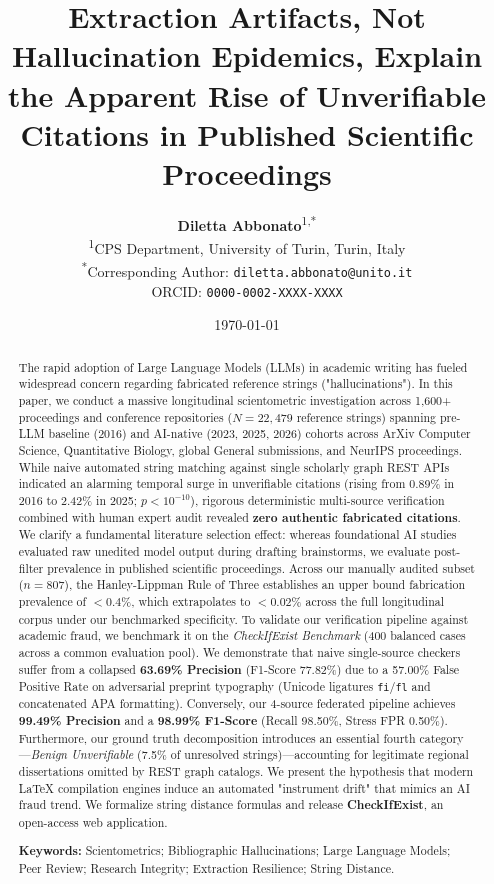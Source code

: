 \documentclass[11pt, a4paper]{article}
\title{\textbf{Extraction Artifacts, Not Hallucination Epidemics, Explain the Apparent Rise of Unverifiable Citations in Published Scientific Proceedings}}
\author{
    \textbf{Diletta Abbonato}\textsuperscript{1,*} \\
    \small \textsuperscript{1}CPS Department, University of Turin, Turin, Italy \\
    \small \textsuperscript{*}Corresponding Author: \texttt{diletta.abbonato@unito.it} \\
    \small ORCID: \texttt{0000-0002-XXXX-XXXX} %
}
\date{\today}
\begin{document}
\maketitle

\begin{abstract}
The rapid adoption of Large Language Models (LLMs) in academic writing has fueled widespread concern regarding fabricated reference strings ("hallucinations"). In this paper, we conduct a massive longitudinal scientometric investigation across 1,600+ proceedings and conference repositories (\(N=22,479\) reference strings) spanning pre-LLM baseline (2016) and AI-native (2023, 2025, 2026) cohorts across ArXiv Computer Science, Quantitative Biology, global General submissions, and NeurIPS proceedings. While naive automated string matching against single scholarly graph REST APIs indicated an alarming temporal surge in unverifiable citations (rising from 0.89\% in 2016 to 2.42\% in 2025; \(p < 10^{-10}\)), rigorous deterministic multi-source verification combined with human expert audit revealed \textbf{zero authentic fabricated citations}. We clarify a fundamental literature selection effect: whereas foundational AI studies evaluated raw unedited model output during drafting brainstorms, we evaluate post-filter prevalence in published scientific proceedings. Across our manually audited subset ($n=807$), the Hanley-Lippman Rule of Three establishes an upper bound fabrication prevalence of $<0.4\%$, which extrapolates to \textbf{\(<0.02\%\)} across the full longitudinal corpus under our benchmarked specificity. To validate our verification pipeline against academic fraud, we benchmark it on the \textit{CheckIfExist Benchmark} (400 balanced cases across a common evaluation pool). We demonstrate that naive single-source checkers suffer from a collapsed \textbf{63.69\% Precision} (F1-Score 77.82\%) due to a 57.00\% False Positive Rate on adversarial preprint typography (Unicode ligatures \texttt{fi}/\texttt{fl} and concatenated APA formatting). Conversely, our 4-source federated pipeline achieves \textbf{99.49\% Precision} and a \textbf{98.99\% F1-Score} (Recall 98.50\%, Stress FPR 0.50\%). Furthermore, our ground truth decomposition introduces an essential fourth category---\textit{Benign Unverifiable} (7.5\% of unresolved strings)---accounting for legitimate regional dissertations omitted by REST graph catalogs. We present the hypothesis that modern LaTeX compilation engines induce an automated "instrument drift" that mimics an AI fraud trend. We formalize string distance formulas and release \textbf{CheckIfExist}, an open-access web application.

\vspace{6pt}
\noindent \textbf{Keywords:} Scientometrics; Bibliographic Hallucinations; Large Language Models; Peer Review; Research Integrity; Extraction Resilience; String Distance.
\end{abstract}
\end{document}
